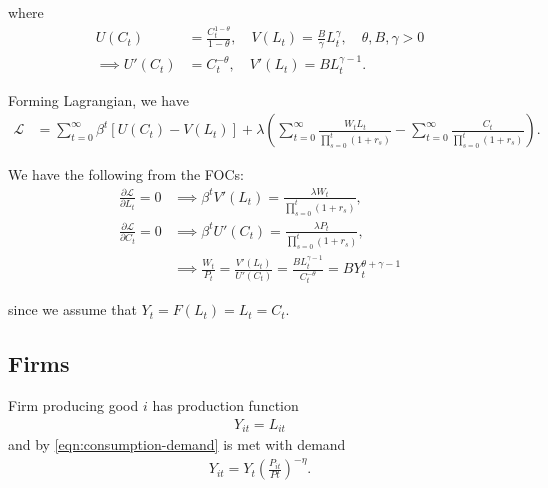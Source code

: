 \documentclass{article}
\renewcommand{\L}{\mathcal{L}}
\newcommand{\?}{\textcolor{red}{(?)}} %
\begin{document}
        where
        \begin{align}
            U(C_t) &= \frac{C_t^{1-\theta}}{1-\theta},
            \quad
            V(L_t) = \frac{B}{\gamma} L_t^\gamma, 
            \quad 
            \theta, B, \gamma > 0
            \\
            \implies
            U'(C_t) &= C_t^{-\theta},
            \quad
            V'(L_t) = B L_t^{\gamma - 1}.
        \end{align}
        
        Forming Lagrangian, we have
        \begin{align}
            \L &= \sum_{t=0}^{\infty} \beta^{t} [U(C_t) - V(L_t)] + \lambda 
            \left(
                \sum_{t=0}^{\infty} \frac{W_t L_t}{\prod_{s=0}^{t}(1+r_{s})}
                - 
                \sum_{t=0}^{\infty} \frac{C_t}{\prod_{s=0}^{t}(1+r_{s})}
            \right).
        \end{align}
        
        We have the following from the FOCs:
        \begin{align}
            \frac{\partial \L}{\partial L_t} = 0
            &\implies
            \beta^t V'(L_t) = \frac{\lambda W_t}{\prod_{s=0}^{t}(1+r_{s})},
            \\
            \frac{\partial \L}{\partial C_t} = 0
            &\implies
            \beta^t U'(C_t) = \frac{\lambda P_t}{\prod_{s=0}^{t}(1+r_{s})},
            \\
            &\implies
            \frac{W_t}{P_t} = \frac{V'(L_t)}{U'(C_t)}
            = \frac{BL_t^{\gamma - 1}}{C_t^{-\theta}}
            = B Y_t ^{\theta + \gamma - 1}
            \label{eqn:eqm-wage}
        \end{align}
        
        since we assume that $Y_t = F(L_t) = L_t = C_t$. %
        
    
    \subsection{Firms}
    
        Firm producing good $i$ has production function
        \begin{align}
            Y_{it} = L_{it}
        \end{align}
        and by \eqref{eqn:consumption-demand} is met with demand
        \begin{align}
            Y_{it} = Y_t \left(\frac{P_{it}}{Pt}\right)^{-\eta}.
            \label{eqn:markup-demand}
        \end{align}
        
\end{document}
